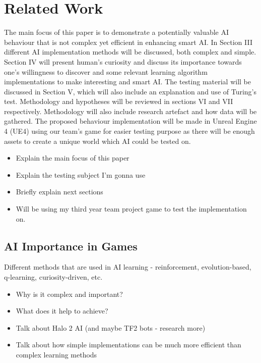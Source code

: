 \documentclass[journal]{IEEEtran}
\begin{document}
\section{Related Work} %
The main focus of this paper is to demonstrate a potentially valuable AI behaviour that is not complex yet efficient in enhancing smart AI. In Section III different AI implementation methods will be discussed, both complex and simple. Section IV will present human's curiosity and discuss its importance towards one's willingness to discover and some relevant learning algorithm implementations to make interesting and smart AI. The testing material will be discussed in Section V, which will also include an explanation and use of Turing's test. Methodology and hypotheses will be reviewed in sections VI and VII respectively. Methodology will also include research artefact and how data will be gathered. The proposed behaviour implementation will be made in Unreal Engine 4 (UE4) using our team's game for easier testing purpose as there will be enough assets to create a unique world which AI could be tested on.
\begin{itemize}
	\item Explain the main focus of this paper
	\item Explain the testing subject I'm gonna use
	\item Briefly explain next sections
	\item Will be using my third year team project game to test the implementation on.
\end{itemize}

\subsection{AI Importance in Games}
Different methods that are used in AI learning - reinforcement, evolution-based, q-learning, curiosity-driven, etc. 
\begin{itemize}
	\item Why is it complex and important?
	\item What does it help to achieve? 
	\item Talk about Halo 2 AI (and maybe TF2 bots - research more)
	\item Talk about how simple implementations can be much more efficient than complex learning methods
\end{itemize}
\end{document}
